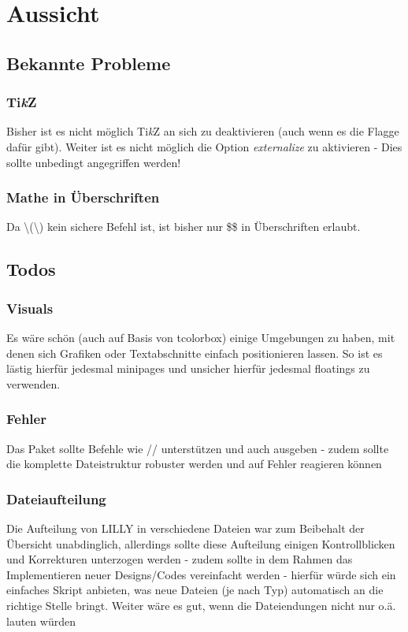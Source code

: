 \chapter{Aussicht}
\section{Bekannte Probleme}
\subsection{Ti\emph{k}Z}
Bisher ist es nicht möglich Ti\emph{k}Z an sich zu deaktivieren (auch wenn es die Flagge dafür gibt). \textcolor{Awesome}{Weiter ist es nicht möglich die Option \emph{externalize} zu aktivieren} - Dies sollte unbedingt angegriffen werden!
\subsection{Mathe in Überschriften}
Da \dq\textbackslash(\textbackslash)\dq{} kein sichere Befehl ist, ist bisher nur \dq\$\$\dq{} in Überschriften erlaubt.
\section{Todos}
\subsection{Visuals}
Es wäre schön (auch auf Basis von tcolorbox) einige Umgebungen zu haben, mit denen sich Grafiken oder Textabschnitte einfach positionieren lassen. So ist es lästig hierfür jedesmal minipages und unsicher hierfür jedesmal floatings zu verwenden.
\subsection{Fehler}
Das Paket sollte Befehle wie // unterstützen und auch ausgeben - zudem sollte die komplette Dateistruktur robuster werden und auf Fehler reagieren können
\subsection{Dateiaufteilung}
Die Aufteilung von LILLY in verschiedene Dateien war zum Beibehalt der Übersicht unabdinglich, allerdings sollte diese Aufteilung einigen Kontrollblicken und Korrekturen unterzogen werden - zudem sollte in dem Rahmen das Implementieren neuer Designs/Codes vereinfacht werden - hierfür würde sich ein einfaches Skript anbieten, was neue Dateien (je nach Typ) automatisch an die richtige Stelle bringt. Weiter wäre es gut, wenn die Dateiendungen nicht nur  o.ä. lauten würden

